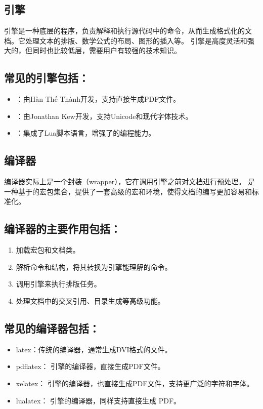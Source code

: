 \subsection*{ 引擎}
 引擎是一种底层的程序，负责解释和执行源代码中的命令，从而生成格式化的文档。它处理文本的排版、数学公式的布局、图形的插入等。 引擎是高度灵活和强大的，但同时也比较低层，需要用户有较强的技术知识。

\subsection*{常见的引擎包括：}
\begin{itemize}
	\item {}：由Hàn Thế Thành开发，支持直接生成PDF文件。
	\item {}：由Jonathan Kew开发，支持Unicode和现代字体技术。
	\item {}：集成了Lua脚本语言，增强了的编程能力。
\end{itemize}

\subsection*{ 编译器}
 编译器实际上是一个封装（wrapper），它在调用引擎之前对文档进行预处理。 是一种基于的宏包集合，提供了一套高级的宏和环境，使得文档的编写更加容易和标准化。

\subsection*{ 编译器的主要作用包括：}
\begin{enumerate}
	\item 加载宏包和文档类。
	\item 解析命令和结构，将其转换为引擎能理解的命令。
	\item 调用引擎来执行排版任务。
	\item 处理文档中的交叉引用、目录生成等高级功能。
\end{enumerate}

\subsection*{常见的编译器包括：}

\begin{itemize}
	\item latex：传统的编译器，通常生成DVI格式的文件。
	\item pdflatex： 引擎的编译器，直接生成PDF文件。
	\item xelatex： 引擎的编译器，也直接生成PDF文件，支持更广泛的字符和字体。
	\item lualatex： 引擎的编译器，同样支持直接生成 PDF。
\end{itemize}

